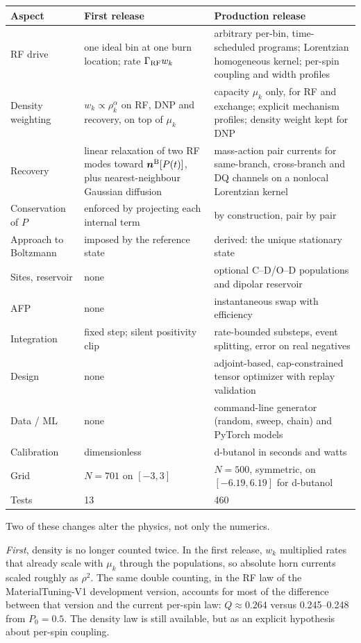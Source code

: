 \documentclass[11pt]{article}
\begin{document}
\begin{longtable}{L{0.18\textwidth} L{0.36\textwidth} L{0.38\textwidth}}
\toprule
Aspect & First release & Production release \\
\midrule
RF drive & one ideal bin at one burn location; rate \(\Gamma_{\rm RF}w_k\) & arbitrary per-bin, time-scheduled programs; Lorentzian homogeneous kernel; per-spin coupling and width profiles \\
Density weighting & \(w_k\propto\rho_k^\alpha\) on RF, DNP and recovery, on top of \(\mu_k\) & capacity \(\mu_k\) only, for RF and exchange; explicit mechanism profiles; density weight kept for DNP \\
Recovery & linear relaxation of two RF modes toward \(\bm n^{\rm B}[P(t)]\), plus nearest-neighbour Gaussian diffusion & mass-action pair currents for same-branch, cross-branch and DQ channels on a nonlocal Lorentzian kernel \\
Conservation of \(P\) & enforced by projecting each internal term & by construction, pair by pair \\
Approach to Boltzmann & imposed by the reference state & derived: the unique stationary state \\
Sites, reservoir & none & optional C--D/O--D populations and dipolar reservoir \\
AFP & none & instantaneous swap with efficiency \\
Integration & fixed step; silent positivity clip & rate-bounded substeps, event splitting, error on real negatives \\
Design & none & adjoint-based, cap-constrained tensor optimizer with replay validation \\
Data / ML & none & command-line generator (random, sweep, chain) and PyTorch models \\
Calibration & dimensionless & d-butanol in seconds and watts \\
Grid & \(N=701\) on \([-3,3]\) & \(N=500\), symmetric, on \([-6.19,6.19]\) for d-butanol \\
Tests & 13 & 460 \\
\bottomrule
\end{longtable}

Two of these changes alter the physics, not only the numerics.

\emph{First}, density is no longer counted twice. In the first release, \(w_k\) multiplied rates
that already scale with \(\mu_k\) through the populations, so absolute horn currents scaled
roughly as \(\rho^2\). The same double counting, in the RF law of the MaterialTuning-V1
development version, accounts for most of the difference between that version and the current
per-spin law: \(Q\approx0.264\) versus 0.245--0.248 from \(P_0=0.5\). The density law is still
available, but as an explicit hypothesis about per-spin coupling.
\end{document}
